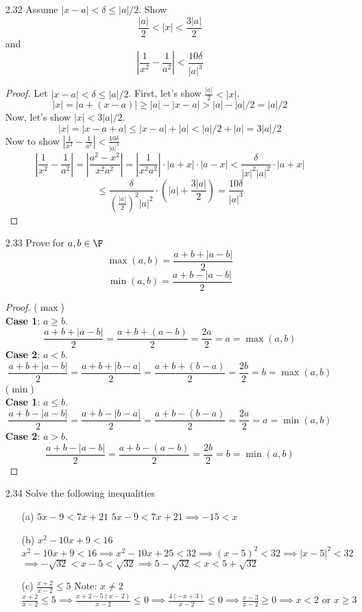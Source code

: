 \documentclass[12pt]{article}
\begin{document}
\begin{enumerate}
\begin{proof}
		\end{proof}
		\item[2.32] Assume $|x-a| < \delta \leq |a|/2$. Show
		\[\frac{|a|}{2} < |x| < \frac{3|a|}{2}\]
		and
		\[|\frac{1}{x^2} - \frac{1}{a^2}| < \frac{10\delta}{|a|^3}\]
		\begin{proof}
			Let $|x-a| < \delta \leq |a|/2$. First, let's show $\frac{|a|}{2} < |x|$.\\
			\[|x| = |a+(x-a)| \geq |a|-|x-a| > |a|-|a|/2 = |a|/2\]
			Now, let's show $|x| < 3|a|/2$.
			\[|x| = |x-a+a| \leq |x-a|+|a| < |a|/2 + |a| = 3|a|/2\]
			Now to show $|\frac{1}{x^2} - \frac{1}{a^2}| < \frac{10\delta}{|a|^3}$
			\[|\frac{1}{x^2} - \frac{1}{a^2}| = |\frac{a^2-x^2}{x^2a^2}| = |\frac{1}{x^2a^2}|\cdot|a+x|\cdot|a-x| < \frac{\delta}{|x|^2|a|^2}\cdot|a+x|\]
			\[\leq \frac{\delta}{(\frac{|a|}{2})^2|a|^2} \cdot (|a|+\frac{3|a|}{2}) = \frac{10\delta}{|a|^3}\]
		\end{proof}
		\item[2.33] Prove for $a,b\in\F$
		\[\max(a,b) = \frac{a+b+|a-b|}{2}\]
		\[\min(a,b) = \frac{a+b-|a-b|}{2}\]
		\begin{proof}
			($\max$)\\
			\textbf{Case 1}: $a \geq b$.\\
			\[\frac{a+b+|a-b|}{2} = \frac{a+b+(a-b)}{2} = \frac{2a}{2} = a = \max(a,b)\]
			\textbf{Case 2}: $a < b$.\\
			\[\frac{a+b+|a-b|}{2} = \frac{a+b+|b-a|}{2} = \frac{a+b+(b-a)}{2} = \frac{2b}{2} = b = \max(a,b)\]
			($\min$)\\
			\textbf{Case 1}: $a \leq b$.\\
			\[\frac{a+b-|a-b|}{2} = \frac{a+b-|b-a|}{2} = \frac{a+b-(b-a)}{2} = \frac{2a}{2} = a = \min(a,b)\]
			\textbf{Case 2}: $a > b$.\\
			\[\frac{a+b-|a-b|}{2} = \frac{a+b-(a-b)}{2} = \frac{2b}{2} = b = \min(a,b)\]
		\end{proof}
		\item[2.34] Solve the following inequalities
		\begin{enumerate}
			\item[(a)] $5x-9 < 7x+21$\m
			$5x-9 < 7x+21 \implies -15<x$
			\item[(b)] $x^2-10x+9 < 16$\m
			$x^2-10x+9 < 16 \implies x^2-10x+25 < 32 \implies (x-5)^2 < 32 \implies |x-5|^2 < 32$\\ 
			$\implies -\sqrt{32} < x-5 < \sqrt{32} \implies 5-\sqrt{32} < x < 5 + \sqrt{32}$
			\item[(c)] $\frac{x+2}{x-2} \leq 5$\m
			Note: $x\neq2$\\
			$\frac{x+2}{x-2} \leq 5 \implies \frac{x+2-5(x-2)}{x-2} \leq 0 \implies \frac{4(-x+3)}{x-2} \leq 0 \implies \frac{x-3}{x-2} \geq 0 \implies x<2 \text{ or } x\geq3$
		\end{enumerate}
	
	\end{enumerate}
\end{document}
